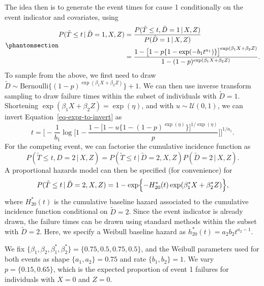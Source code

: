 \documentclass[
  letterpaper,
  paper=240mm:170mm,
  twoside=true,
  open=right,
  fontsize=10pt,
  pagesize=false,
  BCOR=15mm,
  DIV=14,
  headinclude=true,
  footinclude=false,
  headsepline=on]{scrbook}
\newcommand{\given}{\,|\,}
\begin{document}
The idea then is to generate the event times for cause 1 conditionally
on the event indicator and covariates, using
\begin{equation}\phantomsection\label{eq-expr-to-invert}{
\begin{aligned}
    P(\tilde{T} \leq t \given \tilde{D}=1, X, Z) &= \frac{P(\tilde{T} \leq t, \tilde{D}=1 \given X, Z)}{P(\tilde{D} = 1 \given X, Z)} \\
    &= \frac{1 - \big[1-p\{1- \exp(-b_1t^{a_1})\}\big]^{\exp(\beta_{1}X + \beta_{2}Z)}}{1 - (1-p)^{\exp(\beta_{1}X + \beta_{2}Z)}}. 
\end{aligned}
}\end{equation} To sample from the above, we first need to draw
\(\tilde{D} \sim \text{Bernoulli}\{(1-p)^{\exp(\beta_{1}X + \beta_{2}Z)}\} + 1\).
We can then use inverse transform sampling to draw failure times within
the subset of individuals with \(\tilde{D} = 1\). Shortening
\(\exp(\beta_{1}X + \beta_{2}Z) = \exp(\eta)\), and with
\(u \sim \mathcal{U}(0,1)\), we can invert
Equation~\ref{eq-expr-to-invert} as \begin{equation*}
    t = \Biggl[- \frac{1}{b_1}\log\Bigg[1 - \frac{1-\big[ 1 - u\{1 - (1-p)^{\exp(\eta)}\} \big]^{1/\exp(\eta)}}{p} \Bigg]\Biggr]^{1/{a_1}}.
\end{equation*} For the competing event, we can factorise the cumulative
incidence function as \begin{equation*}
    P(\tilde{T} \leq t, D=2 \given X, Z) = P(\tilde{T} \leq t \given \tilde{D}=2,  X, Z)P(\tilde{D}=2 \given X, Z).
\end{equation*} A proportional hazards model can then be specified (for
convenience) for \begin{equation*}
    P(\tilde{T} \leq t \given \tilde{D}=2,  X, Z) = 1 - \exp\Bigl\{-H_{20}^*(t)\exp(\beta_{1}^*X + \beta_{2}^*Z) \Bigr\},
\end{equation*} where \(H_{20}^*(t)\) is the cumulative baseline hazard
associated to the cumulative incidence function conditional on
\(\tilde{D} = 2\). Since the event indicator is already drawn, the
failure times can be drawn using standard methods within the subset with
\(\tilde{D} = 2\). Here, we specify a Weibull baseline hazard as
\(h_{20}^*(t) = a_2b_2t^{a_2 - 1}\).

We fix
\(\{\beta_{1}, \beta_{2},\beta_{1}^*,\beta_{2}^*\} = \{0.75, 0.5, 0.75, 0.5\}\),
and the Weibull parameters used for both events as shape
\(\{a_1,a_2\} = 0.75\) and rate \(\{b_1,b_2\} = 1\). We vary
\(p = \{0.15, 0.65\}\), which is the expected proportion of event 1
failures for individuals with \(X = 0\) and \(Z = 0\).
\end{document}
